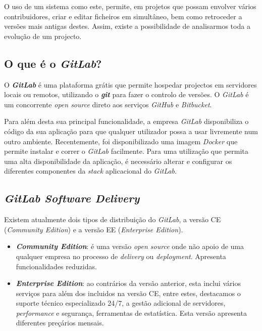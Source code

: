 \documentclass[12pt,a4paper]{article}
\begin{document}
O uso de um sistema como este, permite, em projetos que possam envolver vários contribuidores, criar e editar ficheiros em simultâneo, bem como retroceder a versões mais antigas destes. Assim, existe a possibilidade de analisarmos toda a evolução de um projecto.

\subsection{O que é o \emph{GitLab}?}
O \textbf{\emph{GitLab}} é uma plataforma grátis que permite hospedar projectos em servidores locais ou remotos, utilizando o \textbf{\emph{git}} para fazer o controlo de versões. O \emph{GitLab} é um concorrente \emph{open source} direto aos serviços \emph{GitHub} e \emph{Bitbucket}.

Para além desta sua principal funcionalidade, a empresa \emph{GitLab} disponibiliza o código da sua aplicação para que qualquer utilizador possa a usar livremente num outro ambiente. Recentemente, foi disponibilizado uma imagem \emph{Docker} que permite instalar e correr o \emph{GitLab} facilmente. Para uma utilização que permita uma alta disponibilidade da aplicação, é necessário alterar e configurar os diferentes componentes da \emph{stack} aplicacional do \emph{GitLab}.

\subsection{\emph{GitLab Software Delivery}}
Existem atualmente dois tipos de distribuição do \emph{GitLab}, a versão CE (\emph{Community Edition}) e a versão EE (\emph{Enterprise Edition}).

\begin{itemize}
    \item \textbf{\emph{Community Edition}}: é uma versão \emph{open source} onde não apoio de uma qualquer empresa no processo de \emph{delivery} ou \emph{deployment}. Apresenta funcionalidades reduzidas.
    \item \textbf{\emph{Enterprise Edition}}: ao contrários da versão anterior, esta inclui vários serviços para além dos incluidos na versão CE, entre estes, destacamos o suporte técnico especializado 24/7, a gestão adicional de servidores, \emph{performance} e segurança, ferramentas de estatística. Esta versão apresenta diferentes preçários mensais.
\end{itemize}
\end{document}
